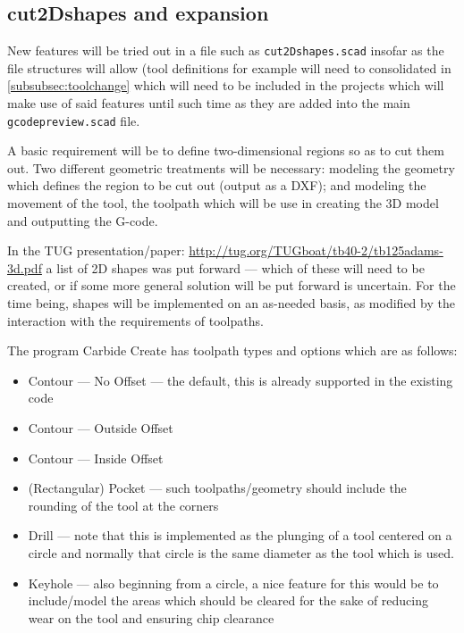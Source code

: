 \documentclass{ltxdoc}
\begin{document}
\begin{samepage}
\section{cut2Dshapes and expansion}
 
New features will be tried out in a file such as \texttt{cut2Dshapes.scad} insofar as the 
file structures will allow (tool definitions for example will need to consolidated in 
\ref{subsubsec:toolchange} which will need
to be included in the projects which will make use of said features until such time
as they are added into the main \texttt{gcodepreview.scad} file.

A basic requirement will be to define two-dimensional regions so as to cut them out.
Two different geometric treatments will be necessary: modeling the geometry which 
defines the region to be cut out (output as a DXF); and modeling the movement of the
tool, the toolpath which will be use in creating the 3D model and outputting the 
G-code.

In the TUG presentation/paper: \url{http://tug.org/TUGboat/tb40-2/tb125adams-3d.pdf}
a list of 2D shapes was put forward --- which of these will need to be created,
or if some more general solution will be put forward is uncertain. For the time
being, shapes will be implemented on an as-needed basis, as modified by the
interaction with the requirements of toolpaths.

The program Carbide Create has toolpath types and options which are as follows:

\begin{itemize}
 \item Contour --- No Offset --- the default, this is already supported in the existing code
 \item Contour --- Outside Offset
 \item Contour --- Inside Offset
 \item (Rectangular) Pocket --- such toolpaths/geometry should include the rounding of the tool 
       at the corners 
 \item Drill --- note that this is implemented as the plunging of a tool centered on a circle
                 and normally that circle is the same diameter as the tool which is used.
 \item Keyhole --- also beginning from a circle, a nice feature for this would be to 
                   include/model the areas which should be cleared for the sake of reducing wear
                   on the tool and ensuring chip clearance
\end{itemize}
\end{samepage}
 
\end{document}
